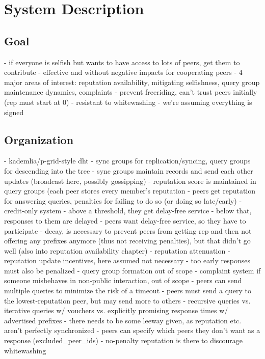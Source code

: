 \chapter{System Description}
\section{Goal}
- if everyone is selfish but wants to have access to lots of peers, get them to
  contribute
- effective and without negative impacts for cooperating peers
- 4 major areas of interest: reputation availability, mitigating selfishness,
  query group maintenance dynamics, complaints
- prevent freeriding, can't trust peers initially (rep must start at 0)
- resistant to whitewashing
- we're assuming everything is signed

\section{Organization}
- kademlia/p-grid-style dht
- sync groups for replication/syncing, query groups for descending into the tree
- sync groups maintain records and send each other updates (broadcast here,
  possibly gossipping)
- reputation score is maintained in query groups (each peer stores every
  member's reputation
- peers get reputation for answering queries, penalties for failing to do so (or
  doing so late/early)
- credit-only system
- above a threshold, they get delay-free service
- below that, responses to them are delayed
- peers want delay-free service, so they have to participate
- decay, is necessary to prevent peers from getting rep and then not offering
  any prefixes anymore (thus not receiving penalties), but that didn't go well
  (also into reputation availability chapter)
- reputation attenuation
- reputation update incentives, here assumed not necessary
- too early responses must also be penalized
- query group formation out of scope
- complaint system if someone misbehaves in non-public interaction, out of scope
- peers can send multiple queries to minimize the risk of a timeout
- peers must send a query to the lowest-reputation peer, but may send more to
  others
- recursive queries vs. iterative queries w/ vouchers vs. explicitly promising
  response times w/ advertised prefixes
- there needs to be some leeway given, as reputation etc. aren't perfectly
  synchronized
- peers can specify which peers they don't want as a response
  (excluded\_peer\_ids)
- no-penalty reputation is there to discourage whitewashing
